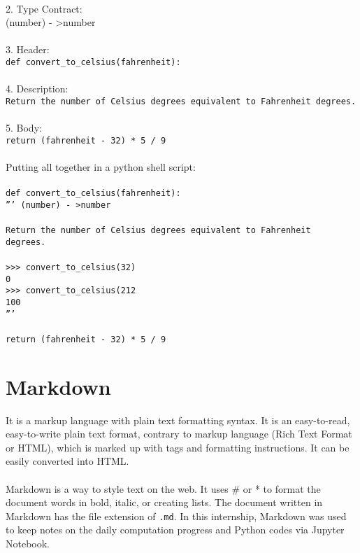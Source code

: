 \documentclass{article}
\begin{document}
{{{\\
2. Type Contract:\\
(number) - \textgreater  number\\
\\
3. Header:\\
\texttt{def convert\_to\_celsius(fahrenheit):}\\
\\
4. Description:\\
\texttt{Return the number of Celsius degrees equivalent to Fahrenheit degrees.}\\
\\
5. Body:\\
\texttt{return (fahrenheit - 32) * 5 / 9}\\
\\
Putting all together in a python shell script:\\
\\
\texttt{def convert\_to\_celsius(fahrenheit):}\\
\indent \indent \texttt{''' (number) - \textgreater  number }\\
\\
\indent \indent \texttt{Return the number of Celsius degrees equivalent to Fahrenheit \\
\indent \indent degrees.}\\
\\
\indent \indent \texttt{>>> convert\_to\_celsius(32)}\\
\indent \indent \texttt{0}\\
\indent \indent \texttt{>>> convert\_to\_celsius(212}\\
\indent \indent \texttt{100}\\
\indent \indent \texttt{'''}\\
\\
\indent \indent \texttt{return (fahrenheit - 32) * 5 / 9}

\newpage
\section{Markdown}
It is a markup language with plain text formatting syntax. It is an easy-to-read, easy-to-write plain text format, contrary to markup language (Rich Text Format or HTML), which is marked up with tags and formatting instructions. It can be easily converted into HTML. \\
\\
Markdown is a way to style text on the web. It uses \# or * to format the document words  in bold, italic, or creating lists. 
The document written in Markdown has the file extension of \texttt{.md}. In this internship, Markdown was used to keep notes on the daily computation progress and Python codes via Jupyter Notebook. 

}}}
\end{document}
